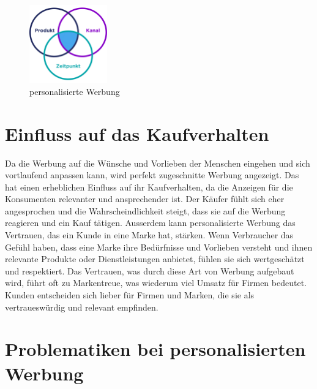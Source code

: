 \documentclass{article}
\begin{document}
 \begin{figure}[ht]
    \centering
    \includegraphics[width=0.3\textwidth]{Infografik.jpg}
    \caption{personalisierte Werbung}
    \label{fig:personaliserte Werbung}
    \end{figure}

 \section{Einfluss auf das Kaufverhalten}
Da die Werbung auf die Wünsche und Vorlieben der Menschen eingehen und sich vortlaufend anpassen kann, wird perfekt zugeschnitte Werbung angezeigt. Das hat einen erheblichen Einfluss auf ihr Kaufverhalten, da die Anzeigen für die Konsumenten relevanter und ansprechender ist. Der Käufer fühlt sich eher angesprochen und die Wahrscheindlichkeit steigt, dass sie auf die Werbung reagieren und ein Kauf tätigen. Ausserdem kann personalisierte Werbung das Vertrauen, das ein Kunde in eine Marke hat, stärken. Wenn Verbraucher das Gefühl haben, dass eine Marke ihre Bedürfnisse und Vorlieben versteht und ihnen relevante Produkte oder Dienstleistungen anbietet, fühlen sie sich wertgeschätzt und respektiert. Das Vertrauen, was durch diese Art von Werbung aufgebaut wird, führt oft zu Markentreue, was wiederum viel Umsatz für Firmen bedeutet. Kunden entscheiden sich lieber für Firmen und Marken, die sie als vertraueswürdig und relevant empfinden. 

\section{Problematiken bei personalisierten Werbung}
\end{document}
